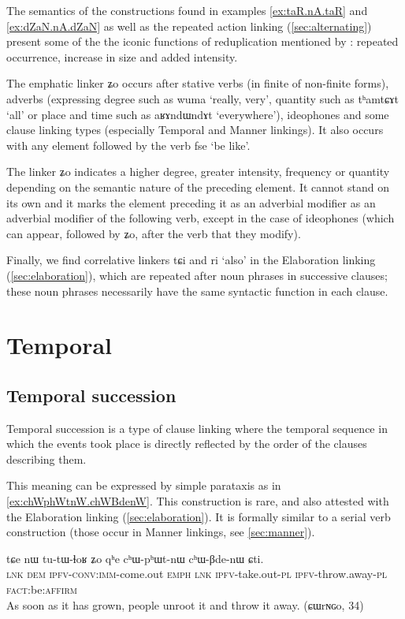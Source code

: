 \documentclass[oldfontcommands,oneside,a4paper,11pt]{article}
\newcommand{\ipa}[1]{{\phon \mbox{#1}}} %
\begin{document}
The semantics of the constructions found in examples \ref{ex:taR.nA.taR}  and \ref{ex:dZaN.nA.dZaN} as well as the   repeated action linking  (\ref{sec:alternating}) present some of the the iconic functions of reduplication mentioned by \citet[76]{sapir21lg}: repeated occurrence, increase in size and added intensity.

The emphatic linker \ipa{ʑo} occurs after stative verbs (in finite of non-finite forms), adverbs (expressing degree such as \ipa{wuma} `really, very', quantity such as \ipa{tʰamtɕɤt} `all' or place and time such as \ipa{aʁɤndɯndɤt} `everywhere'),  ideophones and some clause linking types (especially Temporal and Manner linkings). It also occurs with any element followed by the verb \ipa{fse} `be like'. 

The linker \ipa{ʑo} indicates a higher degree, greater  intensity, frequency or quantity depending on the semantic nature of the preceding element. It cannot stand on its own  and it marks   the element preceding it as an adverbial modifier as an adverbial modifier of the following verb, except in the case of ideophones (which can appear, followed by \ipa{ʑo}, after the verb that they modify).


Finally, we find correlative linkers   \ipa{tɕi} and \ipa{ri} `also' in the Elaboration linking (\ref{sec:elaboration}), which are repeated after  noun phrases in successive clauses; these noun phrases necessarily have the same syntactic function in each clause.

\section{Temporal}
\subsection{Temporal succession}  \label{sec:temporal.succession}

Temporal succession is a type of clause linking where the temporal sequence in which the events  took place is directly reflected by the order of the clauses describing them.   

This meaning can be expressed by simple parataxis as in \ref{ex:chWphWtnW.chWBdenW}. This construction is rare, and also attested with the Elaboration linking (\ref{sec:elaboration}). It is formally similar to a serial verb construction (those occur in Manner linkings, see \ref{sec:manner}).
\begin{exe}
\ex \label{ex:chWphWtnW.chWBdenW}
\gll 
\ipa{tɕe}  	\ipa{nɯ}  	\ipa{tu-tɯ-ɬoʁ}  	\ipa{ʑo}  	\ipa{qʰe}  	\ipa{cʰɯ-pʰɯt-nɯ}  	\ipa{cʰɯ-βde-nɯ}  	\ipa{ɕti.}  \\
\textsc{lnk} \textsc{dem} \textsc{ipfv-conv:imm}-come.out \textsc{emph} \textsc{lnk} \textsc{ipfv}-take.out-\textsc{pl} \textsc{ipfv}-throw.away-\textsc{pl}  \textsc{fact}:be:\textsc{affirm} \\
\glt As soon as it has grown, people unroot it and throw it away. (ɕɯrɴɢo, 34)
\end{exe}
\end{document}
